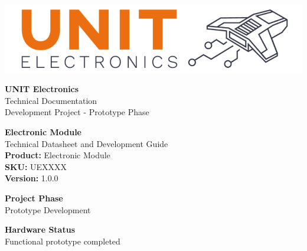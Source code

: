 \documentclass[11pt,a4paper]{article}
\begin{document}
\begin{titlepage}
    \centering
    
    \vspace*{0.5cm}
    
    \begin{minipage}{0.3\textwidth}
        \centering
        
        \includegraphics[width=\textwidth]{logo.png}
        
    \end{minipage}
    \hfill
    \begin{minipage}{0.6\textwidth}
        \raggedleft
        {\small \textbf{UNIT Electronics}}\\
        {\footnotesize Technical Documentation}\\
        {\footnotesize Development Project - Prototype Phase}
    \end{minipage}
    
    \vspace{2cm}
    
    {\huge \textbf{Electronic Module}}\\[0.5cm]
    
    
    {\Large Technical Datasheet and Development Guide}\\[1cm]
    
    
    
    {\large \textbf{Product:} Electronic Module}\\[0.3cm]
    
    
    
    {\large \textbf{SKU:} UEXXXX}\\[0.3cm]
    
    
    
    {\large \textbf{Version:} 1.0.0}\\[1cm]
    
    
    \vfill
    
    \begin{minipage}{0.45\textwidth}
        \centering
        \textbf{Project Phase}\\
        Prototype Development
    \end{minipage}
    \hfill
    \begin{minipage}{0.45\textwidth}
        \centering
        \textbf{Hardware Status}\\
        Functional prototype completed
    \end{minipage}
    

\end{titlepage}
\end{document}

